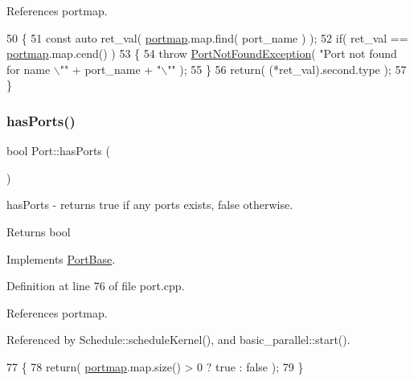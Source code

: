References portmap.


\begin{DoxyCode}
50 \{
51    \textcolor{keyword}{const} \textcolor{keyword}{auto} ret\_val( \hyperlink{class_port_a537a8a0c2a47acbf8654f286200aee90}{portmap}.map.find( port\_name ) );
52    \textcolor{keywordflow}{if}( ret\_val == \hyperlink{class_port_a537a8a0c2a47acbf8654f286200aee90}{portmap}.map.cend() )
53    \{
54       \textcolor{keywordflow}{throw} \hyperlink{class_port_not_found_exception}{PortNotFoundException}( \textcolor{stringliteral}{"Port not found for name \(\backslash\)""} + port\_name + \textcolor{stringliteral}{"\(\backslash\)""} );
55    \}
56    \textcolor{keywordflow}{return}( (*ret\_val).second.type );
57 \}
\end{DoxyCode}
\hypertarget{class_port_a7042f5b5c2ab14c9591a4984811a6012}{}\label{class_port_a7042f5b5c2ab14c9591a4984811a6012} 
\subsubsection{\texorpdfstring{has\+Ports()}{hasPorts()}}
{\footnotesize\ttfamily bool Port\+::has\+Ports (\begin{DoxyParamCaption}{ }\end{DoxyParamCaption})\hspace{0.3cm}{\ttfamily [virtual]}}

has\+Ports -\/ returns true if any ports exists, false otherwise. \begin{DoxyReturn}{Returns}
bool 
\end{DoxyReturn}


Implements \hyperlink{class_port_base_a29870b5e201f46a806d2269d7f4635dc}{Port\+Base}.



Definition at line 76 of file port.\+cpp.



References portmap.



Referenced by Schedule\+::schedule\+Kernel(), and basic\+\_\+parallel\+::start().


\begin{DoxyCode}
77 \{
78    \textcolor{keywordflow}{return}( \hyperlink{class_port_a537a8a0c2a47acbf8654f286200aee90}{portmap}.map.size() > 0 ? \textcolor{keyword}{true} : false );
79 \}
\end{DoxyCode}
\hypertarget{class_port_a90a9a883b2e10871e7a8dc55ab0077f5}{}\label{class_port_a90a9a883b2e10871e7a8dc55ab0077f5} 
